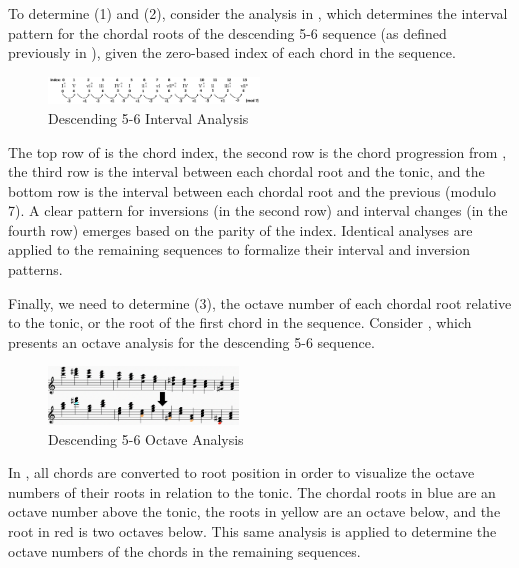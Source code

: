\documentclass{article}
\begin{document}
To determine (1) and (2), consider the analysis in , which determines the interval pattern for the chordal roots of the descending 5-6 sequence (as defined previously in ), given the zero-based index of each chord in the sequence.

\begin{figure}[h!]
\centering
\includegraphics[width=0.5\textwidth]{images/desc_56_intervals}
  \caption{Descending 5-6 Interval Analysis}\label{fig:desc_56_intervals}
\end{figure}
\vspace{-3mm}

The top row of   is the chord index, the second row is the chord progression from , the third row is the interval between each chordal root and the tonic, and the bottom row is the interval between each chordal root and the previous (modulo 7). A clear pattern for inversions (in the second row) and interval changes (in the fourth row) emerges based on the parity of the index. Identical analyses are applied to the remaining sequences to formalize their interval and inversion patterns.

Finally, we need to determine (3), the octave number of each chordal root relative to the tonic, or the root of the first chord in the sequence. Consider , which presents an octave analysis for the descending 5-6 sequence.

\vspace{-2mm}
\begin{figure}[h!]
\centering
\includegraphics[width=0.45\textwidth]{images/desc56-example}
  \caption{Descending 5-6 Octave Analysis}
  \label{fig:desc56-example}
\end{figure}
\vspace{-3mm}

In , all chords are converted to root position in order to visualize the octave numbers of their roots in relation to the tonic. The chordal roots in blue are an octave number above the tonic, the roots in yellow are an octave below, and the root in red is two octaves below. This same analysis is applied to determine the octave numbers of the chords in the remaining sequences.
\end{document}
